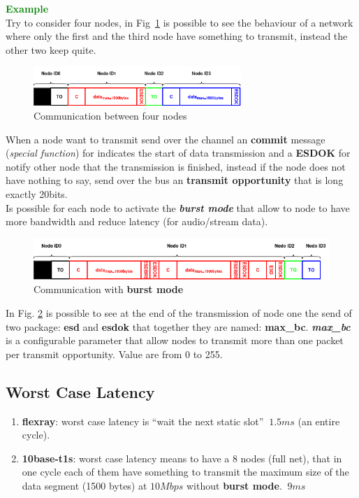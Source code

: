 \textcolor{green}{\textbf{Example}} \\
Try to consider four nodes, in Fig~\ref{fig:example_t1s} is possible to see the behaviour of a network where only the first and the third node have something to transmit, instead the other two keep quite.

\begin{figure}[h]
    \centering
    \includegraphics[width=0.7\textwidth]{img/t1s_ex_1}
    \caption{Communication between four nodes}
    \label{fig:example_t1s}
\end{figure}
When a node want to transmit send over the channel an \textbf{commit} message (\textit{special function}) for indicates the start of data transmission and a \textbf{ESDOK} for notify other node that the transmission is finished, instead if the node does not have nothing to say, send over the bus an \textbf{transmit opportunity} that is long exactly 20bits. \\ \newline
Is possible for each node to activate the \textbf{\textit{burst mode}} that allow to node to have more bandwidth and reduce latency (for audio/stream data).

\begin{figure}[h]
    \centering
    \includegraphics[width=\textwidth]{img/t1s_ex_2}
    \caption{Communication with \textbf{burst mode}}
    \label{fig:example_bm}
\end{figure}
In Fig. \ref{fig:example_bm} is possible to see at the end of the transmission of node one the send of two package: \textbf{esd} and \textbf{esdok} that together they are named: \textbf{max\_bc}. \textbf{\textit{max\_bc}} is a configurable parameter that allow nodes to transmit more than one packet per transmit opportunity. Value are from 0 to 255.

\subsection{Worst Case Latency}
\begin{enumerate}[nosep]
    \item \textbf{flexray}: worst case latency is ``wait the next static slot'' $~1.5ms$ (an entire cycle).
    \item \textbf{10base-t1s}: worst case latency means to have a 8 nodes (full net), that in one cycle each of them have something to transmit the maximum size of the data segment (1500 bytes) at $10Mbps$ without \textbf{burst mode}. $~9ms$
\end{enumerate}

